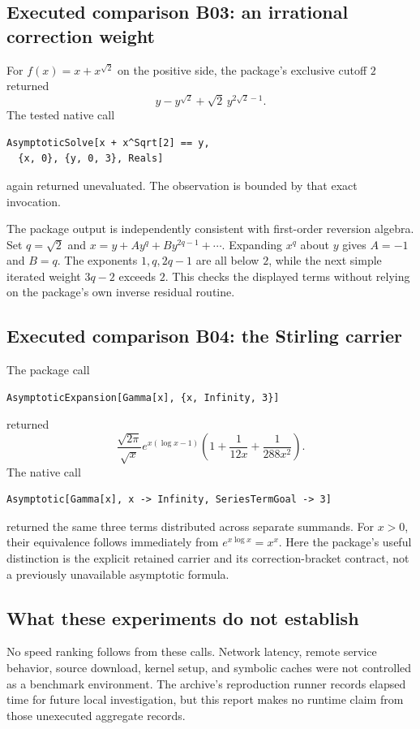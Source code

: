 \documentclass[11pt,letterpaper]{article}
\begin{document}
\subsection{Executed comparison B03: an irrational correction weight}
For $f(x)=x+x^{\sqrt2}$ on the positive side, the package's exclusive cutoff $2$ returned
\begin{equation}
 y-y^{\sqrt2}+\sqrt2\,y^{2\sqrt2-1}.
 \label{eq:irrationalinverse}
\end{equation}
The tested native call
\begin{lstlisting}
AsymptoticSolve[x + x^Sqrt[2] == y,
  {x, 0}, {y, 0, 3}, Reals]
\end{lstlisting}
again returned unevaluated. The observation is bounded by that exact invocation.

The package output is independently consistent with first-order reversion algebra. Set $q=\sqrt2$ and $x=y+A y^q+B y^{2q-1}+\cdots$. Expanding $x^q$ about $y$ gives $A=-1$ and $B=q$. The exponents $1,q,2q-1$ are all below $2$, while the next simple iterated weight $3q-2$ exceeds $2$. This checks the displayed terms without relying on the package's own inverse residual routine.

\subsection{Executed comparison B04: the Stirling carrier}
The package call
\begin{lstlisting}
AsymptoticExpansion[Gamma[x], {x, Infinity, 3}]
\end{lstlisting}
returned
\begin{equation}
 \frac{\sqrt{2\pi}}{\sqrt{x}}e^{x(\log x-1)}
 \left(1+\frac{1}{12x}+\frac{1}{288x^2}\right).
 \label{eq:stirling}
\end{equation}
The native call
\begin{lstlisting}
Asymptotic[Gamma[x], x -> Infinity, SeriesTermGoal -> 3]
\end{lstlisting}
returned the same three terms distributed across separate summands. For $x>0$, their equivalence follows immediately from $e^{x\log x}=x^x$. Here the package's useful distinction is the explicit retained carrier and its correction-bracket contract, not a previously unavailable asymptotic formula.

\subsection{What these experiments do not establish}
No speed ranking follows from these calls. Network latency, remote service behavior, source download, kernel setup, and symbolic caches were not controlled as a benchmark environment. The archive's reproduction runner records elapsed time for future local investigation, but this report makes no runtime claim from those unexecuted aggregate records.
\end{document}
